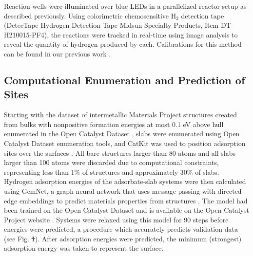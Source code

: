 \documentclass[preprint,12pt]{elsarticle}
\providecommand{\DIFadd}[1]{{\protect\color{blue}\uwave{#1}}} %
\providecommand{\DIFdel}[1]{{\protect\color{red}\sout{#1}}}                      %
\providecommand{\DIFaddbegin}{} %
\providecommand{\DIFaddend}{} %
\providecommand{\DIFdelbegin}{} %
\providecommand{\DIFdelend}{} %
\newcommand{\DIFscaledelfig}{0.5}
\newlength{\DIFdelgraphicswidth} %
\newlength{\DIFdelgraphicsheight} %
\newcommand{\DIFaddincludegraphics}[2][]{{\color{blue}\fbox{\DIFOincludegraphics[#1]{#2}}}} %
\newcommand{\DIFdelincludegraphics}[2][]{%
\sbox{\DIFdelgraphicsbox}{\DIFOincludegraphics[#1]{#2}}%
\settoboxwidth{\DIFdelgraphicswidth}{\DIFdelgraphicsbox} %
\settoboxtotalheight{\DIFdelgraphicsheight}{\DIFdelgraphicsbox} %
\scalebox{\DIFscaledelfig}{%
\parbox[b]{\DIFdelgraphicswidth}{\usebox{\DIFdelgraphicsbox}\\[-\baselineskip] \rule{\DIFdelgraphicswidth}{0em}}\llap{\resizebox{\DIFdelgraphicswidth}{\DIFdelgraphicsheight}{%
\setlength{\unitlength}{\DIFdelgraphicswidth}%
\begin{picture}(1,1)%
\thicklines\linethickness{2pt} %
{\color[rgb]{1,0,0}\put(0,0){\framebox(1,1){}}}%
{\color[rgb]{1,0,0}\put(0,0){\line( 1,1){1}}}%
{\color[rgb]{1,0,0}\put(0,1){\line(1,-1){1}}}%
\end{picture}%
}\hspace*{3pt}}} %
} %
\DeclareRobustCommand{\DIFaddbegin}{\DIFOaddbegin \let\includegraphics\DIFaddincludegraphics} %
\DeclareRobustCommand{\DIFaddend}{\DIFOaddend \let\includegraphics\DIFOincludegraphics} %
\DeclareRobustCommand{\DIFdelbegin}{\DIFOdelbegin \let\includegraphics\DIFdelincludegraphics} %
\DeclareRobustCommand{\DIFdelend}{\DIFOaddend \let\includegraphics\DIFOincludegraphics} %
\begin{document}
Reaction wells were illuminated over blue LEDs in a parallelized reactor setup as described previously. Using colorimetric chemosensitive H$_2$ detection tape (DetecTape Hydrogen Detection Tape-Midsun Specialty Products, Item DT-H210015-PF4), the reactions were tracked in real-time using image analysis to reveal the quantity of hydrogen produced by each. Calibrations for this method can be found in our previous work \cite{lopato2020parallelized}.


\subsection{Computational Enumeration and Prediction of Sites}\label{Section:Experimental/Enumeration}
Starting with the dataset of intermetallic Materials Project structures created from bulks with nonpositive formation energies at most 0.1 eV above hull enumerated in the Open Catalyst Dataset \cite{chanussot2021open,ong2013python}, slabs were enumerated using Open Catalyst Dataset enumeration tools, and CatKit was used to position adsorption sites over the surfaces \cite{boes2019graph}. All bare structures larger than 80 atoms and all slabs larger than 100 atoms were discarded due to computational constraints, representing less than 1\% of structures and approximately 30\% of slabs. Hydrogen adsorption energies of the adsorbate-slab systems were then calculated using GemNet, a graph neural network that uses message passing with directed edge embeddings to predict materials properties from structures \cite{klicpera2021gemnet}. The model had been trained on the Open Catalyst Dataset and is available on the Open Catalyst Project website \cite{chanussot2021open}. Systems were relaxed using this model for 90 steps before energies were predicted, a procedure which accurately predicts validation data (see Fig. \DIFdelbegin \DIFdel{1}\DIFdelend \DIFaddbegin \DIFadd{\ref{figure_1}}\DIFaddend ). After adsorption energies were predicted, the minimum (strongest) adsorption energy was taken to represent the surface. 
\end{document}

